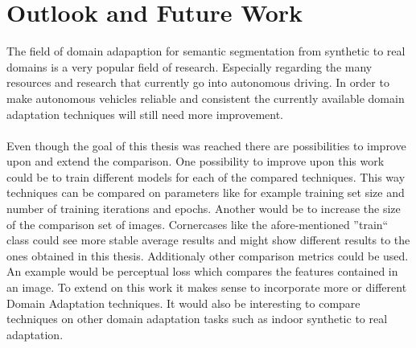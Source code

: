 \section{Outlook and Future Work}

The field of domain adapaption for semantic segmentation from synthetic to real domains is a very popular field of research. Especially regarding the many resources and research that currently go into autonomous driving. In order to make autonomous vehicles reliable and consistent the currently available domain adaptation techniques will still need more improvement. 

\paragraph{}
Even though the goal of this thesis was reached there are possibilities to improve upon and extend the comparison. One possibility to improve upon this work could be to train different models for each of the compared techniques. This way techniques can be compared on parameters like for example training set size and number of training iterations and epochs. Another would be to increase the size of the comparison set of images. Cornercases like the afore-mentioned ''train`` class could see more stable average results and might show different results to the ones obtained in this thesis. Additionaly other comparison metrics could be used. An example would be perceptual loss which compares the features contained in an image. To extend on this work it makes sense to incorporate more or different Domain Adaptation techniques. It would also be interesting to compare techniques on other domain adaptation tasks such as indoor synthetic to real adaptation. 